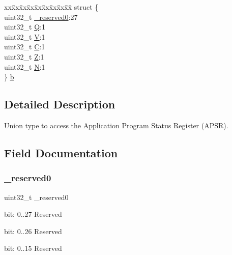 \begin{DoxyCompactItemize}
\begin{tabbing}
\end{tabbing}\item 
\begin{tabbing}
xx\=xx\=xx\=xx\=xx\=xx\=xx\=xx\=xx\=\kill
struct \{\\
\>uint32\_t \hyperlink{union_a_p_s_r___type_ac8a6a13838a897c8d0b8bc991bbaf7c1}{\_reserved0}:27\\
\>uint32\_t \hyperlink{union_a_p_s_r___type_a65f27ddc4f7e09c14ce7c5211b2e000a}{Q}:1\\
\>uint32\_t \hyperlink{union_a_p_s_r___type_acd4a2b64faee91e4a9eef300667fa222}{V}:1\\
\>uint32\_t \hyperlink{union_a_p_s_r___type_a7a1caf92f32fe9ebd8d1fe89b06c7776}{C}:1\\
\>uint32\_t \hyperlink{union_a_p_s_r___type_a5ae954cbd9986cd64625d7fa00943c8e}{Z}:1\\
\>uint32\_t \hyperlink{union_a_p_s_r___type_abae0610bc2a97bbf7f689e953e0b451f}{N}:1\\
\} \hyperlink{union_a_p_s_r___type_ac7f3bcfa917f29ae98a10b199395ff9d}{b}\\

\end{tabbing}\end{DoxyCompactItemize}


\subsection{Detailed Description}
Union type to access the Application Program Status Register (A\+P\+SR). 

\subsection{Field Documentation}
\mbox{\label{union_a_p_s_r___type_ac8a6a13838a897c8d0b8bc991bbaf7c1}} 
\subsubsection{\texorpdfstring{\+\_\+reserved0}{\_reserved0}}
{\footnotesize\ttfamily uint32\+\_\+t \+\_\+reserved0}

bit\+: 0..27 Reserved

bit\+: 0..26 Reserved

bit\+: 0..15 Reserved \mbox{\label{union_a_p_s_r___type_a959a73d8faee56599b7e792a7c5a2d16}} 
